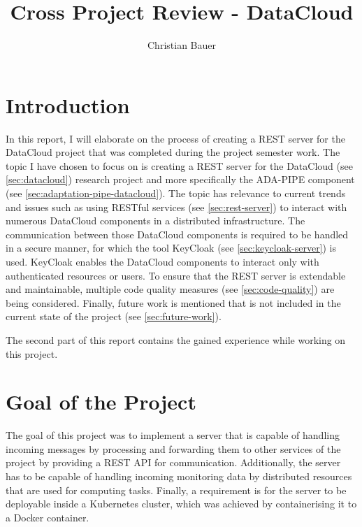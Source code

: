 \documentclass{article}
\title{Cross Project Review - DataCloud}
\author{Christian Bauer}
\begin{document}
    \maketitle

    \tableofcontents
    \lstlistoflistings
    \pagebreak

    \section{Introduction}
    \label{sec:introduction}


        In this report, I will elaborate on the process of creating a REST server for the DataCloud project that was completed during the project semester work.
        The topic I have chosen to focus on is creating a REST server for the DataCloud (see \ref{sec:datacloud}) research project and more specifically the ADA-PIPE component (see \ref{sec:adaptation-pipe-datacloud}). 
        The topic has relevance to current trends and issues such as using RESTful services (see \ref{sec:rest-server}) to interact with numerous DataCloud components in a distributed infrastructure. 
        The communication between those DataCloud components is required to be handled in a secure manner, for which the tool KeyCloak (see \ref{sec:keycloak-server}) is used. KeyCloak enables the DataCloud components to interact only with authenticated resources or users.
        To ensure that the REST server is extendable and maintainable, multiple code quality measures (see \ref{sec:code-quality}) are being considered.
        Finally, future work is mentioned that is not included in the current state of the project (see \ref{sec:future-work}).

        The second part  of this report contains the gained experience while working on this project.

    \section{Goal of the Project}
    \label{sec:goal-of-the-project}

        The goal of this project was to implement a server that is capable of handling incoming messages by processing and forwarding them to other services of the  project by providing a REST API for communication.
        Additionally, the server has to be capable of handling incoming monitoring data by distributed resources that are used for computing tasks. 
        Finally, a requirement is for the server to be deployable inside a Kubernetes cluster, which was achieved by containerising it to a Docker container.
    
\end{document}
